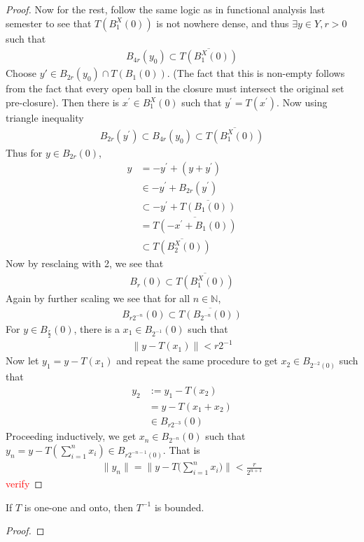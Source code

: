 \begin{proof}
  Now for the rest, follow the same logic as in functional analysis
  last semester to see that $T(B_1^X(0))$ is not nowhere dense, and
  thus $\exists y \in Y, r > 0$ such that
  \begin{align*}
    B_{4r}(y_0) \subset \overline{ T(B_1^X(0))}
  \end{align*}
  Choose $y' \in B_{2r}(y_0) \cap T(B_1(0))$. (The fact that this is
    non-empty follows from the fact that every open ball in the closure
  must intersect the original set pre-closure). Then  there is
  $x^\prime \in B_1^X(0)$ such that $y^\prime = T(x^\prime)$. Now
  using triangle inequality
  \begin{align*}
    B_{2r}(y^\prime) \subset B_{4r}(y_0) \subset \overline{ T(B_1^X(0))}
  \end{align*}
  Thus for $y \in B_{2r}(0)$,
  \begin{align*}
    y &= - y^\prime + (y + y^\prime) \\
    &\in -y^\prime + B_{2r}(y^\prime) \\
    &\subset -y^\prime + \overline{T(B_1(0))} \\
    &= \overline{ T( -x^\prime + B_1(0))} \\
    &\subset \overline{T(B_2^X(0))}
  \end{align*}
  Now by resclaing with 2, we see that
  \begin{align*}
    B_r(0)  \subset \overline{T(B_1^X(0))}
  \end{align*}
  Again by further scaling we see that for all $n \in \mathbb{N}$,
  \begin{align*}
    B_{r2^{-n}}(0) \subset \overline{ T(B_{2^{-n}}(0))}
  \end{align*}
  For $y \in B_{\frac{r}{2}}(0)$, there is a $x_1 \in B_{2^{-1}}(0)$ such that
  \begin{align*}
    \|y - T(x_1)\| < r2^{-1}
  \end{align*}
  Now let $y_1 = y - T(x_1)$ and repeat the same procedure to get
  $x_2 \in B_{2^{-2}(0)}$ such that
  \begin{align*}
    y_2 &:= y_1 - T(x_2) \\
    &=y - T( x_1 + x_2) \\
    &\in B_{ r2^{-3}}(0)
  \end{align*}
  Proceeding inductively, we get $x_n \in B_{2^{-n}}(0)$ such that
  $y_n = y-T(\sum_{i = 1}^{n} x_i) \in B_{ r2^{-n-1}(0)}$. That is
  \begin{align*}
    \|y_n\| = \Big \| y - T \big(\sum_{i = 1}^{n} x_i\big) \Big \| <
    \frac{r}{2^{n+1}}
  \end{align*}
  \textcolor{red}{verify}
\end{proof}

\begin{corollary}
  If $T$ is one-one and onto, then $T^{-1}$ is bounded.
\end{corollary}
\begin{proof}

\end{proof}
